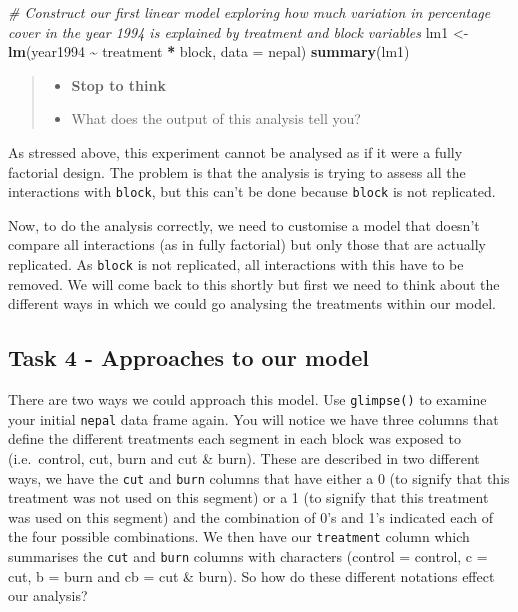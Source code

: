 \documentclass[
]{book}
\newenvironment{Shaded}{\begin{snugshade}}{\end{snugshade}}
\newcommand{\AttributeTok}[1]{\textcolor[rgb]{0.13,0.29,0.53}{#1}}
\newcommand{\CommentTok}[1]{\textcolor[rgb]{0.56,0.35,0.01}{\textit{#1}}}
\newcommand{\FunctionTok}[1]{\textcolor[rgb]{0.13,0.29,0.53}{\textbf{#1}}}
\newcommand{\NormalTok}[1]{#1}
\newcommand{\OtherTok}[1]{\textcolor[rgb]{0.56,0.35,0.01}{#1}}
\newcommand{\SpecialCharTok}[1]{\textcolor[rgb]{0.81,0.36,0.00}{\textbf{#1}}}
\providecommand{\tightlist}{%
  \setlength{\itemsep}{0pt}\setlength{\parskip}{0pt}}
\begin{document}
\begin{Shaded}
\begin{Highlighting}[]
\CommentTok{\# Construct our first linear model exploring how much variation in percentage cover in the year 1994 is explained by treatment and block variables}
\NormalTok{lm1 }\OtherTok{\textless{}{-}} \FunctionTok{lm}\NormalTok{(year1994 }\SpecialCharTok{\textasciitilde{}}\NormalTok{ treatment }\SpecialCharTok{*}\NormalTok{ block, }\AttributeTok{data =}\NormalTok{ nepal)}
\FunctionTok{summary}\NormalTok{(lm1)}
\end{Highlighting}
\end{Shaded}

\begin{quote}
\begin{itemize}
\tightlist
\item
  \textbf{Stop to think}
\item
  What does the output of this analysis tell you?
\end{itemize}
\end{quote}

As stressed above, this experiment cannot be analysed as if it were a fully factorial design. The problem is that the analysis is trying to assess all the interactions with \texttt{block}, but this can't be done because \texttt{block} is not replicated.

Now, to do the analysis correctly, we need to customise a model that doesn't compare all interactions (as in fully factorial) but only those that are actually replicated. As \texttt{block} is not replicated, all interactions with this have to be removed. We will come back to this shortly but first we need to think about the different ways in which we could go analysing the treatments within our model.

\subsection{Task 4 - Approaches to our model}\label{task-4---approaches-to-our-model}

There are two ways we could approach this model. Use \texttt{glimpse()} to examine your initial \texttt{nepal} data frame again. You will notice we have three columns that define the different treatments each segment in each block was exposed to (i.e.~control, cut, burn and cut \& burn). These are described in two different ways, we have the \texttt{cut} and \texttt{burn} columns that have either a 0 (to signify that this treatment was not used on this segment) or a 1 (to signify that this treatment was used on this segment) and the combination of 0's and 1's indicated each of the four possible combinations. We then have our \texttt{treatment} column which summarises the \texttt{cut} and \texttt{burn} columns with characters (control = control, c = cut, b = burn and cb = cut \& burn). So how do these different notations effect our analysis?
\end{document}

